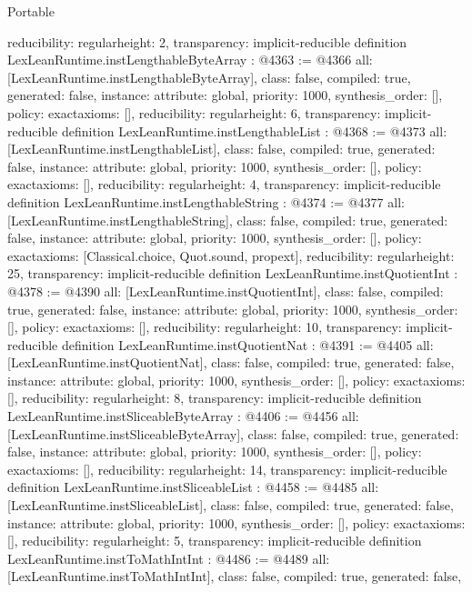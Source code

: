 \begin{lexlean}{Portable}
\begin{coremodule}
{  reducibility: regular{height: 2},
  transparency: implicit-reducible
}
definition LexLeanRuntime.instLengthableByteArray : @4363 := @4366 {
  all: [LexLeanRuntime.instLengthableByteArray],
  class: false,
  compiled: true,
  generated: false,
  instance: {attribute: global, priority: 1000, synthesis_order: []},
  policy: exact{axioms: []},
  reducibility: regular{height: 6},
  transparency: implicit-reducible
}
definition LexLeanRuntime.instLengthableList : @4368 := @4373 {
  all: [LexLeanRuntime.instLengthableList],
  class: false,
  compiled: true,
  generated: false,
  instance: {attribute: global, priority: 1000, synthesis_order: []},
  policy: exact{axioms: []},
  reducibility: regular{height: 4},
  transparency: implicit-reducible
}
definition LexLeanRuntime.instLengthableString : @4374 := @4377 {
  all: [LexLeanRuntime.instLengthableString],
  class: false,
  compiled: true,
  generated: false,
  instance: {attribute: global, priority: 1000, synthesis_order: []},
  policy: exact{axioms: [Classical.choice, Quot.sound, propext]},
  reducibility: regular{height: 25},
  transparency: implicit-reducible
}
definition LexLeanRuntime.instQuotientInt : @4378 := @4390 {
  all: [LexLeanRuntime.instQuotientInt],
  class: false,
  compiled: true,
  generated: false,
  instance: {attribute: global, priority: 1000, synthesis_order: []},
  policy: exact{axioms: []},
  reducibility: regular{height: 10},
  transparency: implicit-reducible
}
definition LexLeanRuntime.instQuotientNat : @4391 := @4405 {
  all: [LexLeanRuntime.instQuotientNat],
  class: false,
  compiled: true,
  generated: false,
  instance: {attribute: global, priority: 1000, synthesis_order: []},
  policy: exact{axioms: []},
  reducibility: regular{height: 8},
  transparency: implicit-reducible
}
definition LexLeanRuntime.instSliceableByteArray : @4406 := @4456 {
  all: [LexLeanRuntime.instSliceableByteArray],
  class: false,
  compiled: true,
  generated: false,
  instance: {attribute: global, priority: 1000, synthesis_order: []},
  policy: exact{axioms: []},
  reducibility: regular{height: 14},
  transparency: implicit-reducible
}
definition LexLeanRuntime.instSliceableList : @4458 := @4485 {
  all: [LexLeanRuntime.instSliceableList],
  class: false,
  compiled: true,
  generated: false,
  instance: {attribute: global, priority: 1000, synthesis_order: []},
  policy: exact{axioms: []},
  reducibility: regular{height: 5},
  transparency: implicit-reducible
}
definition LexLeanRuntime.instToMathIntInt : @4486 := @4489 {
  all: [LexLeanRuntime.instToMathIntInt],
  class: false,
  compiled: true,
  generated: false,
}
\end{coremodule}
\end{lexlean}
